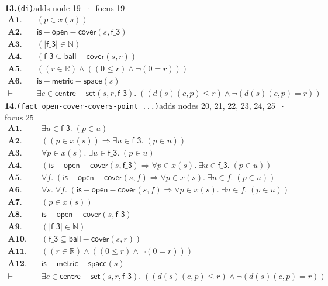 \documentclass[11pt]{article}
\begin{document}
\medskip\noindent\textbf{13.}\quad \texttt{(di)}\hfill{\small adds node 19 $\;\cdot\;$ focus 19}\\[2pt]
\begin{align*}
  \mathbf{A1.}\quad & (p \in x(s)) \\
  \mathbf{A2.}\quad & \mathsf{is{-}open{-}cover}(s, \mathsf{f\_3}) \\
  \mathbf{A3.}\quad & (|\mathsf{f\_3}| \in \mathbb{N}) \\
  \mathbf{A4.}\quad & (\mathsf{f\_3} \subseteq \mathsf{ball{-}cover}(s, r)) \\
  \mathbf{A5.}\quad & ((r \in \mathbb{R}) \wedge ((0 \leq r) \wedge \neg (0 = r))) \\
  \mathbf{A6.}\quad & \mathsf{is{-}metric{-}space}(s) \\
  \vdash\quad & \exists c \in \mathsf{centre{-}set}(s, r, \mathsf{f\_3}).\; ((d(s)(c, p) \leq r) \wedge \neg (d(s)(c, p) = r))
\end{align*}
\medskip\noindent\textbf{14.}\quad \texttt{(fact open-cover-covers-point ...)}\hfill{\small adds nodes 20, 21, 22, 23, 24, 25 $\;\cdot\;$ focus 25}\\[2pt]
\begin{align*}
  \mathbf{A1.}\quad & \exists u \in \mathsf{f\_3}.\; (p \in u) \\
  \mathbf{A2.}\quad & ((p \in x(s)) \Rightarrow \exists u \in \mathsf{f\_3}.\; (p \in u)) \\
  \mathbf{A3.}\quad & \forall p \in x(s).\; \exists u \in \mathsf{f\_3}.\; (p \in u) \\
  \mathbf{A4.}\quad & (\mathsf{is{-}open{-}cover}(s, \mathsf{f\_3}) \Rightarrow \forall p \in x(s).\; \exists u \in \mathsf{f\_3}.\; (p \in u)) \\
  \mathbf{A5.}\quad & \forall f.\; (\mathsf{is{-}open{-}cover}(s, f) \Rightarrow \forall p \in x(s).\; \exists u \in f.\; (p \in u)) \\
  \mathbf{A6.}\quad & \forall s.\; \forall f.\; (\mathsf{is{-}open{-}cover}(s, f) \Rightarrow \forall p \in x(s).\; \exists u \in f.\; (p \in u)) \\
  \mathbf{A7.}\quad & (p \in x(s)) \\
  \mathbf{A8.}\quad & \mathsf{is{-}open{-}cover}(s, \mathsf{f\_3}) \\
  \mathbf{A9.}\quad & (|\mathsf{f\_3}| \in \mathbb{N}) \\
  \mathbf{A10.}\quad & (\mathsf{f\_3} \subseteq \mathsf{ball{-}cover}(s, r)) \\
  \mathbf{A11.}\quad & ((r \in \mathbb{R}) \wedge ((0 \leq r) \wedge \neg (0 = r))) \\
  \mathbf{A12.}\quad & \mathsf{is{-}metric{-}space}(s) \\
  \vdash\quad & \exists c \in \mathsf{centre{-}set}(s, r, \mathsf{f\_3}).\; ((d(s)(c, p) \leq r) \wedge \neg (d(s)(c, p) = r))
\end{align*}
\end{document}
